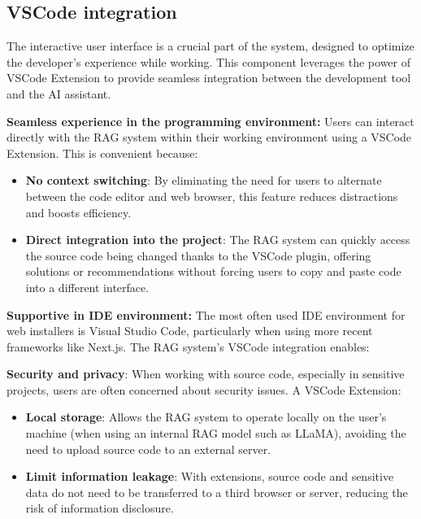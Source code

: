     

\subsection{VSCode integration}
The interactive user interface is a crucial part of the system, designed to optimize the developer's experience while working. This component leverages the power of VSCode Extension to provide seamless integration between the development tool and the AI assistant.

\textbf{Seamless experience in the programming environment:} Users can interact directly with the RAG system within their working environment using a VSCode Extension. This is convenient because:
    \begin{itemize}
        \item \textbf{No context switching}: By eliminating the need for users to alternate between the code editor and web browser, this feature reduces distractions and boosts efficiency.

        \item \textbf{Direct integration into the project}: The RAG system can quickly access the source code being changed thanks to the VSCode plugin, offering solutions or recommendations without forcing users to copy and paste code into a different interface.
    \end{itemize} 
\textbf{Supportive in IDE environment:} The most often used IDE environment for web installers is Visual Studio Code, particularly when using more recent frameworks like Next.js. The RAG system's VSCode integration enables:
\textbf{Security and privacy}: When working with source code, especially in sensitive projects, users are often concerned about security issues. A VSCode Extension:
    \begin{itemize}
        \item \textbf{Local storage}: Allows the RAG system to operate locally on the user's machine (when using an internal RAG model such as LLaMA), avoiding the need to upload source code to an external server.
        \item \textbf{Limit information leakage}: With extensions, source code and sensitive data do not need to be transferred to a third browser or server, reducing the risk of information disclosure.
    \end{itemize}

